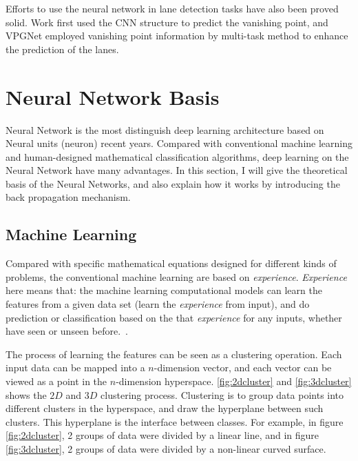 \begin{spacing}{1.5}
Efforts to use the neural network in lane detection tasks have also been proved solid. Work \cite{borji2016vanishing} first used the CNN structure to predict the vanishing point, and VPGNet \cite{lee2017vpgnet} employed vanishing point information by multi-task method to enhance the prediction of the lanes.

\section{Neural Network Basis}
\label{sec:LR_NNB}

Neural Network is the most distinguish deep learning architecture based on Neural units (neuron) recent years. Compared with conventional machine learning and human-designed mathematical classification algorithms, deep learning on the Neural Network have many advantages. In this section, I will give the theoretical basis of the Neural Networks, and also explain how it works by introducing the back propagation mechanism.

\subsection{Machine Learning}

Compared with specific mathematical equations designed for different kinds of problems, the conventional machine learning are based on \textit{experience}. \textit{Experience} here means that: the machine learning computational models can learn the features from a given data set (learn the \textit{experience} from input), and do prediction or classification based on the that \textit{experience} for any inputs, whether have seen or unseen before.~\cite{mohri2018foundations}.

The process of learning the features can be seen as a clustering operation. Each input data can be mapped into a $n$-dimension vector, and each vector can be viewed as a point in the $n$-dimension hyperspace. \autoref{fig:2dcluster} and \autoref{fig:3dcluster} shows the $2D$ and $3D$ clustering process. Clustering is to group data points into different clusters in the hyperspace, and draw the hyperplane between such clusters. This hyperplane is the interface between classes. For example, in figure \autoref{fig:2dcluster}, 2 groups of data were divided by a linear line, and in figure \autoref{fig:3dcluster}, 2 groups of data were divided by a non-linear curved surface.


\end{spacing}
